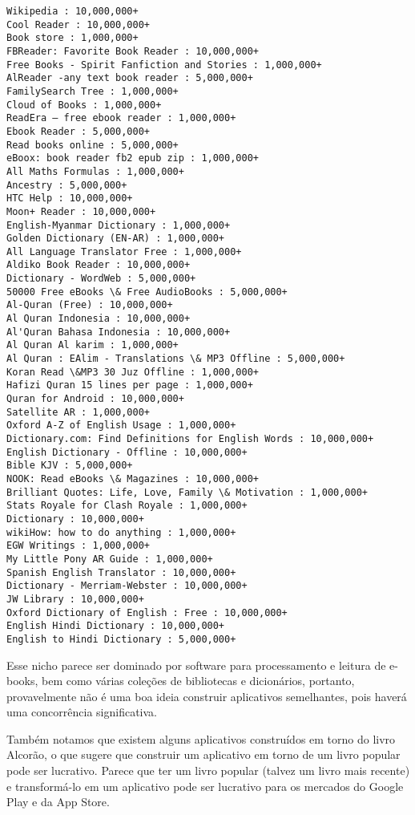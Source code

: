 \documentclass[11pt]{article}
\begin{document}
    \begin{Verbatim}[commandchars=\\\{\}]
Wikipedia : 10,000,000+
Cool Reader : 10,000,000+
Book store : 1,000,000+
FBReader: Favorite Book Reader : 10,000,000+
Free Books - Spirit Fanfiction and Stories : 1,000,000+
AlReader -any text book reader : 5,000,000+
FamilySearch Tree : 1,000,000+
Cloud of Books : 1,000,000+
ReadEra – free ebook reader : 1,000,000+
Ebook Reader : 5,000,000+
Read books online : 5,000,000+
eBoox: book reader fb2 epub zip : 1,000,000+
All Maths Formulas : 1,000,000+
Ancestry : 5,000,000+
HTC Help : 10,000,000+
Moon+ Reader : 10,000,000+
English-Myanmar Dictionary : 1,000,000+
Golden Dictionary (EN-AR) : 1,000,000+
All Language Translator Free : 1,000,000+
Aldiko Book Reader : 10,000,000+
Dictionary - WordWeb : 5,000,000+
50000 Free eBooks \& Free AudioBooks : 5,000,000+
Al-Quran (Free) : 10,000,000+
Al Quran Indonesia : 10,000,000+
Al'Quran Bahasa Indonesia : 10,000,000+
Al Quran Al karim : 1,000,000+
Al Quran : EAlim - Translations \& MP3 Offline : 5,000,000+
Koran Read \&MP3 30 Juz Offline : 1,000,000+
Hafizi Quran 15 lines per page : 1,000,000+
Quran for Android : 10,000,000+
Satellite AR : 1,000,000+
Oxford A-Z of English Usage : 1,000,000+
Dictionary.com: Find Definitions for English Words : 10,000,000+
English Dictionary - Offline : 10,000,000+
Bible KJV : 5,000,000+
NOOK: Read eBooks \& Magazines : 10,000,000+
Brilliant Quotes: Life, Love, Family \& Motivation : 1,000,000+
Stats Royale for Clash Royale : 1,000,000+
Dictionary : 10,000,000+
wikiHow: how to do anything : 1,000,000+
EGW Writings : 1,000,000+
My Little Pony AR Guide : 1,000,000+
Spanish English Translator : 10,000,000+
Dictionary - Merriam-Webster : 10,000,000+
JW Library : 10,000,000+
Oxford Dictionary of English : Free : 10,000,000+
English Hindi Dictionary : 10,000,000+
English to Hindi Dictionary : 5,000,000+

    \end{Verbatim}

    Esse nicho parece ser dominado por software para processamento e leitura
de e-books, bem como várias coleções de bibliotecas e dicionários,
portanto, provavelmente não é uma boa ideia construir aplicativos
semelhantes, pois haverá uma concorrência significativa.

Também notamos que existem alguns aplicativos construídos em torno do
livro Alcorão, o que sugere que construir um aplicativo em torno de um
livro popular pode ser lucrativo. Parece que ter um livro popular
(talvez um livro mais recente) e transformá-lo em um aplicativo pode ser
lucrativo para os mercados do Google Play e da App Store.
\end{document}
